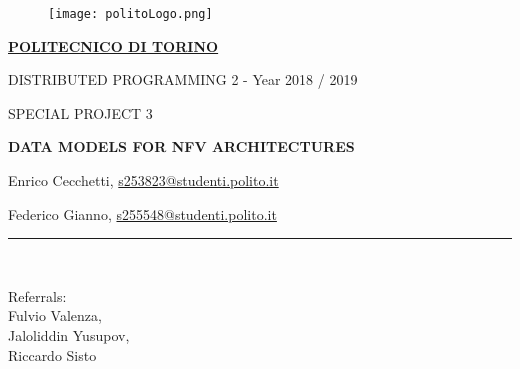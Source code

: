 \documentclass[11pt, english]{article}
\makeatletter
\newcommand*{\email}[1]{%
    \normalsize\href{mailto:#1}{#1}\par
}
\gdef\@date{Year 2018 / 2019}
\makeatother
\begin{document}
\begin{titlepage}

\begin{center}
\vspace*{-1in}
\begin{figure}[htb]
\begin{center}
\texttt{[image: politoLogo.png]}
\end{center}
\end{figure}

\begin{large}
\textbf{\underline{POLITECNICO DI TORINO}} \\
\end{large}
\vspace*{0.15in}
DISTRIBUTED PROGRAMMING 2 - \@date \\ 
\vspace*{0.4in}
\begin{large}
SPECIAL PROJECT 3 \\
\end{large}
\vspace*{0.2in}
\begin{Large}
\textbf{DATA MODELS FOR NFV ARCHITECTURES} \\
\end{Large}
\vspace*{0.3in}
\begin{large}
Enrico Cecchetti, \email{s253823@studenti.polito.it}
Federico Gianno, \email{s255548@studenti.polito.it} 
\end{large}
\vspace*{0.3in}
\rule{80mm}{0.1mm}\\
\vspace*{0.1in}
\begin{large}
Referrals: \\
Fulvio Valenza, \\
Jaloliddin Yusupov, \\
Riccardo Sisto \\
\end{large}
\end{center}
\end{titlepage}

\newcommand{\CC}{C\nolinebreak\hspace{-.05em}\raisebox{.4ex}{\tiny\bf +}\nolinebreak\hspace{-.10em}\raisebox{.4ex}{\tiny\bf +}}
\def\CC{{C\nolinebreak[4]\hspace{-.05em}\raisebox{.4ex}{\tiny\bf ++}}}
\end{document}
